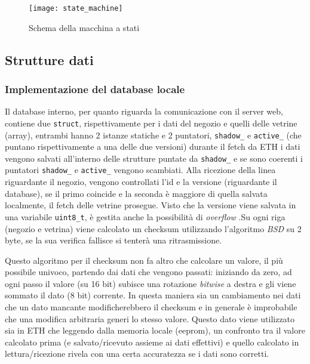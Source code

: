 \begin{figure}[ht]
	\texttt{[image: state\_machine]}
  \caption{Schema della macchina a stati}
  \label{fig:sm}
\end{figure}

\subsection{Strutture dati}

\subsubsection{Implementazione del database locale}


Il database interno, per quanto riguarda la comunicazione con il server web, contiene due \texttt{struct}, rispettivamente per i dati del negozio e quelli delle vetrine (array), entrambi hanno 2 istanze statiche e 2 puntatori, \texttt{shadow\_} e \texttt{active\_} (che puntano rispettivamente a una delle due versioni) durante il fetch da ETH i dati vengono salvati all'interno delle strutture puntate da \texttt{shadow\_} e se sono coerenti i puntatori \texttt{shadow\_} e \texttt{active\_} vengono scambiati. Alla ricezione della linea riguardante il negozio, vengono controllati l'id e la versione (riguardante il database), se il primo coincide e la seconda \`e maggiore di quella salvata localmente, il fetch delle vetrine prosegue. Visto che la versione viene salvata in una variabile \texttt{uint8\_t}, \`e gestita anche la possibilit\`a di \textit{overflow} .Su ogni riga (negozio e vetrina) viene calcolato un checksum utilizzando l'algoritmo \textit{BSD} su 2 byte, se la sua verifica fallisce si tenter\`a una ritrasmissione.

Questo algoritmo per il checksum non fa altro che calcolare un valore, il pi\`u possibile univoco, partendo dai dati che vengono passati: iniziando da zero, ad ogni passo il valore (su 16 bit) subisce una rotazione \textit{bitwise} a destra e gli viene sommato il dato (8 bit) corrente. In questa maniera sia un cambiamento nei dati che un dato mancante modificherebbero il checksum e in generale \`e improbabile che una modifica arbitraria generi lo stesso valore. Questo dato viene utilizzato sia in ETH che leggendo dalla memoria locale (eeprom), un confronto tra il valore calcolato prima (e salvato/ricevuto assieme ai dati effettivi) e quello calcolato in lettura/ricezione rivela con una certa accuratezza se i dati sono corretti.

